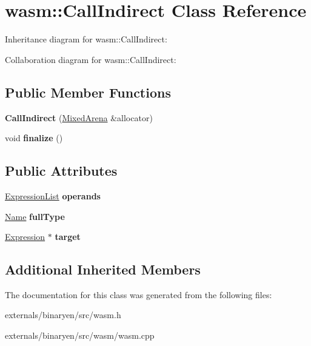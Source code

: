 \hypertarget{classwasm_1_1_call_indirect}{}\section{wasm\+:\+:Call\+Indirect Class Reference}
\label{classwasm_1_1_call_indirect}


Inheritance diagram for wasm\+:\+:Call\+Indirect\+:


Collaboration diagram for wasm\+:\+:Call\+Indirect\+:
\subsection*{Public Member Functions}
\begin{DoxyCompactItemize}
\item 
\mbox{\label{classwasm_1_1_call_indirect_a21233500fa68003e3dd92b2ee8e69823}} 
{\bfseries Call\+Indirect} (\mbox{\hyperlink{struct_mixed_arena}{Mixed\+Arena}} \&allocator)
\item 
\mbox{\label{classwasm_1_1_call_indirect_a0a999db1582e803fdc168d2089c13df7}} 
void {\bfseries finalize} ()
\end{DoxyCompactItemize}
\subsection*{Public Attributes}
\begin{DoxyCompactItemize}
\item 
\mbox{\label{classwasm_1_1_call_indirect_a55b2dcfe1c0ee78000322b3cf186d95b}} 
\mbox{\hyperlink{class_arena_vector}{Expression\+List}} {\bfseries operands}
\item 
\mbox{\label{classwasm_1_1_call_indirect_a91cb0008d4f876b90efeb113120e71e1}} 
\mbox{\hyperlink{structwasm_1_1_name}{Name}} {\bfseries full\+Type}
\item 
\mbox{\label{classwasm_1_1_call_indirect_ab864562f136854c1cd612b08e577629a}} 
\mbox{\hyperlink{classwasm_1_1_expression}{Expression}} $\ast$ {\bfseries target}
\end{DoxyCompactItemize}
\subsection*{Additional Inherited Members}


The documentation for this class was generated from the following files\+:\begin{DoxyCompactItemize}
\item 
externals/binaryen/src/wasm.\+h\item 
externals/binaryen/src/wasm/wasm.\+cpp\end{DoxyCompactItemize}
